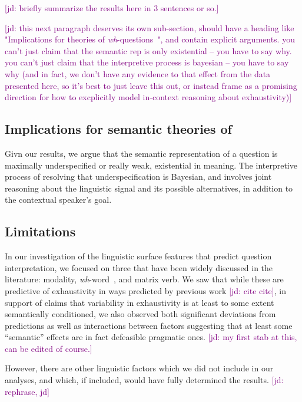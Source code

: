 \documentclass[12pt,letterpaper,table,svgnames,dvipsnames]{article}
\newcommand{\jd}[1]{\textcolor{Purple}{[jd: #1]}}
\newcommand{\whqs}{\emph{wh}-questions~}
\newcommand{\whw}{\emph{wh}-word~}
\begin{document}
\jd{briefly summarize the results here in 3 sentences or so.}



\jd{this next paragraph deserves its own sub-section, should have a heading like "Implications for theories of \whqs", and contain explicit arguments. you can't just claim that the semantic rep is only existential -- you have to say why. you can't just claim that the interpretive process is bayesian -- you have to say why (and in fact, we don't have any evidence to that effect from the data presented here, so it's best to just leave this out, or instead frame as a promising direction for how to excplicitly model in-context reasoning about exhaustivity)}

\subsection{Implications for semantic theories of}
Givn our results, we argue that the semantic representation of a question is maximally underspecified or really weak, existential in meaning. The interpretive process of resolving that underspecification is Bayesian, and involves joint reasoning about the linguistic signal and its possible alternatives, in addition to the contextual speaker's goal.



\subsection{Limitations}

In our investigation of the linguistic surface features that predict question interpretation, we focused on three  that have been widely discussed in the literature: modality, \whw, and matrix verb. We saw that while these are predictive of exhaustivity in ways predicted by previous work \jd{cite cite}, in support of claims that variability in exhaustivity is at least to some extent semantically conditioned, we also observed both significant deviations from predictions as well as interactions between factors suggesting that at least some ``semantic'' effects are in fact defeasible pragmatic ones. \jd{my first stab at this, can be edited of course.} 

However, there are other linguistic factors which we did not include in our analyses, and which, if included, would have fully determined the results. \jd{rephrase, jd} 
\end{document}
